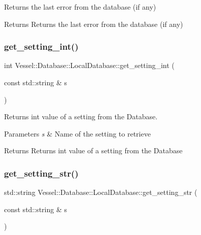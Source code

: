 Returns the last error from the database (if any) 

\begin{DoxyReturn}{Returns}
Returns the last error from the database (if any) 
\end{DoxyReturn}
\mbox{\label{class_vessel_1_1_database_1_1_local_database_af37832c98d2e9eabe40b2a45f5035133}} 
\subsubsection{\texorpdfstring{get\+\_\+setting\+\_\+int()}{get\_setting\_int()}}
{\footnotesize\ttfamily int Vessel\+::\+Database\+::\+Local\+Database\+::get\+\_\+setting\+\_\+int (\begin{DoxyParamCaption}\item[{const std\+::string \&}]{s }\end{DoxyParamCaption})}



Returns int value of a setting from the Database. 


\begin{DoxyParams}{Parameters}
{\em s} & Name of the setting to retrieve \\
\hline
\end{DoxyParams}
\begin{DoxyReturn}{Returns}
Returns int value of a setting from the Database 
\end{DoxyReturn}
\mbox{\label{class_vessel_1_1_database_1_1_local_database_aaeca7268517cb884b7aa7ea4b7f3db04}} 
\subsubsection{\texorpdfstring{get\+\_\+setting\+\_\+str()}{get\_setting\_str()}}
{\footnotesize\ttfamily std\+::string Vessel\+::\+Database\+::\+Local\+Database\+::get\+\_\+setting\+\_\+str (\begin{DoxyParamCaption}\item[{const std\+::string \&}]{s }\end{DoxyParamCaption})}




